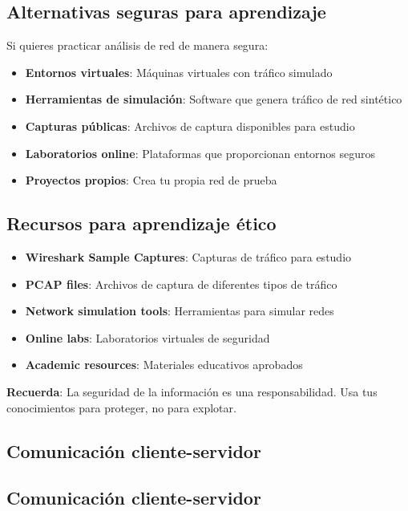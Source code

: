 \begin{itemize}
\subsection{Alternativas seguras para aprendizaje}

Si quieres practicar análisis de red de manera segura:

\begin{itemize}
    \item \textbf{Entornos virtuales}: Máquinas virtuales con tráfico simulado
    \item \textbf{Herramientas de simulación}: Software que genera tráfico de red sintético
    \item \textbf{Capturas públicas}: Archivos de captura disponibles para estudio
    \item \textbf{Laboratorios online}: Plataformas que proporcionan entornos seguros
    \item \textbf{Proyectos propios}: Crea tu propia red de prueba
\end{itemize}

\subsection{Recursos para aprendizaje ético}

\begin{itemize}
    \item \textbf{Wireshark Sample Captures}: Capturas de tráfico para estudio
    \item \textbf{PCAP files}: Archivos de captura de diferentes tipos de tráfico
    \item \textbf{Network simulation tools}: Herramientas para simular redes
    \item \textbf{Online labs}: Laboratorios virtuales de seguridad
    \item \textbf{Academic resources}: Materiales educativos aprobados
\end{itemize}

\textbf{Recuerda}: La seguridad de la información es una responsabilidad. Usa tus conocimientos para proteger, no para explotar.

\subsection{Comunicación cliente-servidor}

\subsection{Comunicación cliente-servidor}


\end{itemize}
